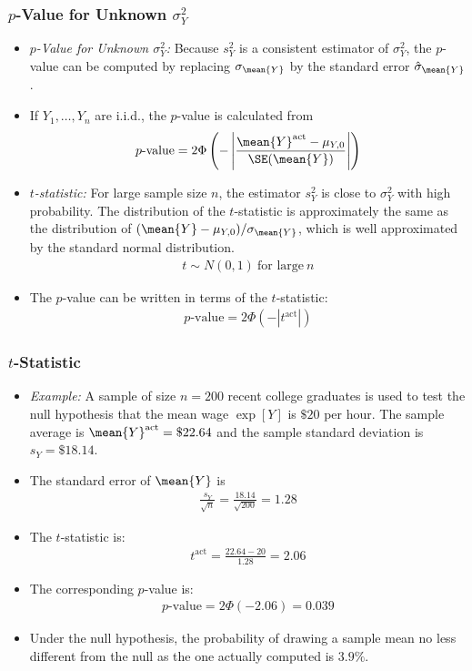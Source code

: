 \begin{frame}
\frametitle{$p$-Value for Unknown $\sigma_Y^2$}
\begin{itemize}
\item \emph{$p$-Value for Unknown $\sigma_Y^2$:}
Because $s_Y^2$ is a consistent estimator of $\sigma_Y^2$, the $p$-value can be computed by replacing $\sigma_{\mean{Y}}$ by the standard error $\hat{\sigma}_{\mean{Y}}$. 
\item If $Y_1,\ldots,Y_n$ are i.i.d., the $p$-value is calculated from
\begin{align*}
p\text{-value} 
  = 2\Phi \left( -\left| \frac{\mean{Y}^{\text{act}} - \mu_{Y,0}}{\SE(\mean{Y})} \right| \right)
\end{align*}
\item \emph{$t$-statistic:} 
For large sample size $n$, the estimator $s_Y^2$ is close to $\sigma_Y^2$ with high probability. The distribution of the $t$-statistic is approximately the same as the distribution of $(\mean{Y}-\mu_{Y,0})/\sigma_{\mean{Y}}$, which is well approximated by the standard normal distribution. 
\begin{align*}
t \sim N(0,1) ~\text{for large}~n
\end{align*}
\item The $p$-value can be written in terms of the $t$-statistic:
\begin{align*}
p\text{-value} 
  = 2\Phi \left(-|t^{\text{act}}|\right)
\end{align*}
\end{itemize}
\end{frame}


\begin{frame}
\frametitle{$t$-Statistic}
\begin{itemize}
\item \emph{Example:} A sample of size $n=200$ recent college graduates is used to test the null hypothesis that the mean wage $\exp[Y]$ is $\$20$ per hour. The sample average is $\mean{Y}^{\text{act}}=\$22.64$ and the sample standard deviation is $s_Y=\$18.14$. 
\item The standard error of $\mean{Y}$ is 
\begin{align*}
\frac{s_Y}{\sqrt{n}} 
  = \frac{18.14}{\sqrt{200}}
  = 1.28
\end{align*}
\item The $t$-statistic is:
\begin{align*}
t^{\text{act}} = \frac{22.64-20}{1.28} = 2.06
\end{align*}
\item The corresponding $p$-value is:
\begin{align*}
p\text{-value} 
  = 2\Phi(-2.06) = 0.039
\end{align*}
\item Under the null hypothesis, the probability of drawing a sample mean no less different from the null as the one actually computed is $3.9\%$.
\end{itemize}
\end{frame}


